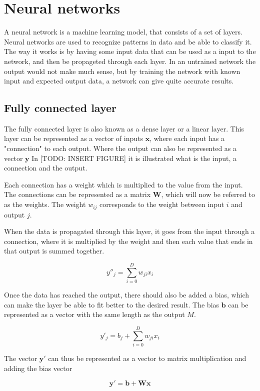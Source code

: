 \section{Neural networks}%
\label{sec:Neural networks}

A neural network is a machine learning model, that consists of a set of layers. Neural networks are used to recognize patterns in data and be able to classify it. The way it works is by having some input data that can be used as a input to the network, and then be propageted through each layer. In an untrained network the output would not make much sense, but by training the network with known input and expected output data, a network can give quite accurate results.

\subsection{Fully connected layer}%
\label{sub:Fully connected layer}

The fully connected layer is also known as a dense layer or a linear layer.
This layer can be represented as a vector of inputs $\bm{x}$, where each input has a "connection" to each output. Where the output can also be represented as a vector $\bm{y}$
In [TODO: INSERT FIGURE] it is illustrated what is the input, a connection and the output.

Each connection has a weight which is multiplied to the value from the input.
The connections can be represented as a matrix $\bm{W}$, which will now be referred to as the weights.
The weight $w_{ij}$ corresponds to the weight between input $i$ and output $j$.

When the data is propagated through this layer, it goes from the input through a connection, where it is multiplied by the weight and then each value that ends in that output is summed together.

$$y''_j = \sum_{i=0}^D w_{ji}x_i  $$

Once the data has reached the output, there should also be added a bias, which can make the layer be able to fit better to the desired result.
The bias $\bm{b}$ can be represented as a vector with the same length as the output $M$.

$$y'_j = b_j + \sum_{i=0}^D w_{ji}x_i$$

The vector $\bm{y'}$ can thus be represented as a vector to matrix multiplication and adding the bias vector

$$\bm{y'} = \bm{b} + \bm{W}\bm{x}$$

